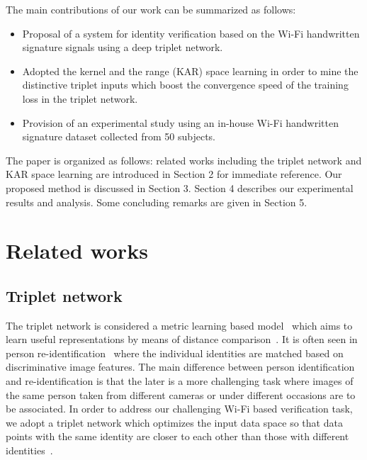 \documentclass{sig-alternate-05-2015}
\begin{document}
The main contributions of our work can be summarized as follows:
\begin{itemize}
\item Proposal of a system for identity verification based on the Wi-Fi handwritten signature signals using a deep triplet network.
\item Adopted the kernel and the range (KAR) space learning in order to mine the distinctive triplet inputs which boost the convergence speed of the training loss in the triplet network.
\item Provision of an experimental study using an in-house Wi-Fi handwritten signature dataset collected from 50 subjects.
\end{itemize}

The paper is organized as follows: related works including the triplet network and KAR space learning are introduced in Section 2 for immediate reference. Our proposed method is discussed in Section 3. Section 4 describes our experimental results and analysis. Some concluding remarks are given in Section 5.

\section{Related works}
\subsection{Triplet network}
The triplet network is considered a metric learning based model~\cite{weinberger2006distance} which aims to learn useful representations by means of distance comparison~\cite{hoffer2015deep}. 
It is often seen in person re-identification~\cite{chen2017beyond,cheng2016person,ding2015deep,schroff2015facenet,wang2016joint} where the individual identities are matched based on discriminative image features. The main difference between person identification and re-identification is that the later is a more challenging task where images of the same person taken from different cameras or under different occasions are to be associated. In order to address our challenging Wi-Fi based verification task, we adopt a triplet network which optimizes the input data space so that data points with the same identity are closer to each other than those with different identities~\cite{hermans2017defense}.
\end{document}

